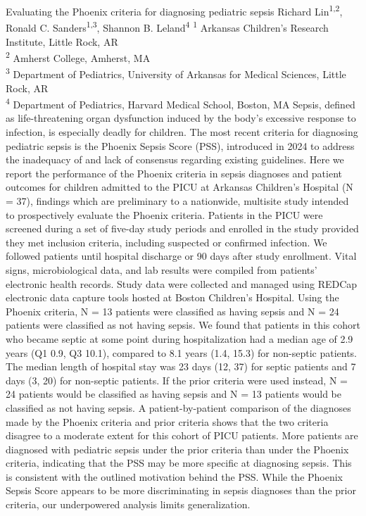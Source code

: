 \makeabstract
    {
    Evaluating the Phoenix criteria for diagnosing pediatric sepsis
    }
    {
    Richard Lin\textsuperscript{1,2}, Ronald C. Sanders\textsuperscript{1,3}, Shannon B. Leland\textsuperscript{4}
    }
    {
    \textsuperscript{1} Arkansas Children's Research Institute, Little Rock, AR\\
\textsuperscript{2} Amherst College, Amherst, MA\\
\textsuperscript{3} Department of Pediatrics, University of Arkansas for Medical Sciences, Little Rock, AR\\
\textsuperscript{4} Department of Pediatrics, Harvard Medical School, Boston, MA
    }
    {
    Sepsis, defined as life-threatening organ dysfunction induced by the body{\textquoteright}s excessive response to infection, is especially deadly for children. The most recent criteria for diagnosing pediatric sepsis is the Phoenix Sepsis Score (PSS), introduced in 2024 to address the inadequacy of and lack of consensus regarding existing guidelines. Here we report the performance of the Phoenix criteria in sepsis diagnoses and patient outcomes for children admitted to the PICU at Arkansas Children{\textquoteright}s Hospital (N = 37), findings which are preliminary to a nationwide, multisite study intended to prospectively evaluate the Phoenix criteria.
    }
    {
    Patients in the PICU were screened during a set of five-day study periods and enrolled in the study provided they met inclusion criteria, including suspected or confirmed infection. We followed patients until hospital discharge or 90 days after study enrollment. Vital signs, microbiological data, and lab results were compiled from patients' electronic health records. Study data were collected and managed using REDCap electronic data capture tools hosted at Boston Children{\textquoteright}s Hospital.
    }
    {
    Using the Phoenix criteria, N = 13 patients were classified as having sepsis and N = 24 patients were classified as not having sepsis. We found that patients in this cohort who became septic at some point during hospitalization had a median age of 2.9 years (Q1 0.9, Q3 10.1), compared to 8.1 years (1.4, 15.3) for non-septic patients. The median length of hospital stay was 23 days (12, 37) for septic patients and 7 days (3, 20) for non-septic patients. If the prior criteria were used instead, N = 24 patients would be classified as having sepsis and N = 13 patients would be classified as not having sepsis. A patient-by-patient comparison of the diagnoses made by the Phoenix criteria and prior criteria shows that the two criteria disagree to a moderate extent for this cohort of PICU patients.
    }
    {
    More patients are diagnosed with pediatric sepsis under the prior criteria than under the Phoenix criteria, indicating that the PSS may be more specific at diagnosing sepsis. This is consistent with the outlined motivation behind the PSS. While the Phoenix Sepsis Score appears to be more discriminating in sepsis diagnoses than the prior criteria, our underpowered analysis limits generalization.
    }

    \newpage
    